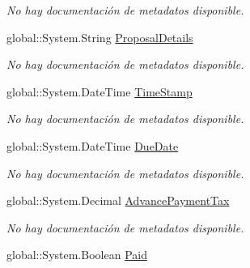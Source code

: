 \begin{DoxyCompactItemize}
\begin{DoxyCompactList}\small\item\em No hay documentación de metadatos disponible. \end{DoxyCompactList}\item 
global\-::\-System.\-String \hyperlink{class_microsoft_1_1_samples_1_1_kinect_1_1_basic_interactions_1_1_invoices_a6ac2ba1cce7874944e48e6556a19d51d}{Proposal\-Details}
\begin{DoxyCompactList}\small\item\em No hay documentación de metadatos disponible. \end{DoxyCompactList}\item 
global\-::\-System.\-Date\-Time \hyperlink{class_microsoft_1_1_samples_1_1_kinect_1_1_basic_interactions_1_1_invoices_a33fe77fbc92417ea7c7b4b9b4448774c}{Time\-Stamp}
\begin{DoxyCompactList}\small\item\em No hay documentación de metadatos disponible. \end{DoxyCompactList}\item 
global\-::\-System.\-Date\-Time \hyperlink{class_microsoft_1_1_samples_1_1_kinect_1_1_basic_interactions_1_1_invoices_a0dd879d6251bbdf8d3ef12c16b6be0b6}{Due\-Date}
\begin{DoxyCompactList}\small\item\em No hay documentación de metadatos disponible. \end{DoxyCompactList}\item 
global\-::\-System.\-Decimal \hyperlink{class_microsoft_1_1_samples_1_1_kinect_1_1_basic_interactions_1_1_invoices_a784526576e4b9e719b01da305f9bbd48}{Advance\-Payment\-Tax}
\begin{DoxyCompactList}\small\item\em No hay documentación de metadatos disponible. \end{DoxyCompactList}\item 
global\-::\-System.\-Boolean \hyperlink{class_microsoft_1_1_samples_1_1_kinect_1_1_basic_interactions_1_1_invoices_accf0a49573b14a21c49e17f2d249ba00}{Paid}

\end{DoxyCompactItemize}
